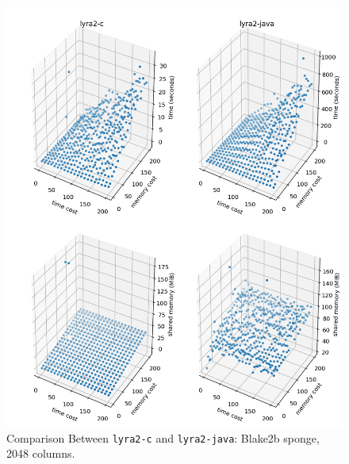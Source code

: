 \begin{figure}[p]
    \centering
    \includegraphics[width=\linewidth,keepaspectratio]{figures/tcost_mcost_blake2b_2048}
    \caption{Comparison Between \texttt{lyra2-c} and \texttt{lyra2-java}: Blake2b sponge, 2048 columns.}
    \label{figure:tcost_mcost_blake2b_2048}
\end{figure}

